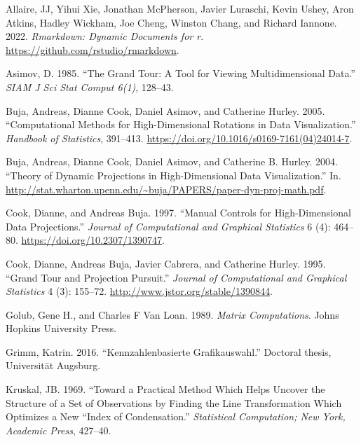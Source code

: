 \documentclass[
]{article}
\newlength{\cslhangindent}
\newlength{\cslentryspacingunit} %
\newenvironment{CSLReferences}[2] %
 {%
  \setlength{\parindent}{0pt}
  \ifodd #1
  \let\oldpar\par
  \def\par{\hangindent=\cslhangindent\oldpar}
  \fi
  \setlength{\parskip}{#2\cslentryspacingunit}
 }%
 {}
\begin{document}
\hypertarget{refs}{}
\begin{CSLReferences}{1}{0}
\leavevmode{}%
Allaire, JJ, Yihui Xie, Jonathan McPherson, Javier Luraschi, Kevin
Ushey, Aron Atkins, Hadley Wickham, Joe Cheng, Winston Chang, and
Richard Iannone. 2022. \emph{Rmarkdown: Dynamic Documents for r}.
\url{https://github.com/rstudio/rmarkdown}.

\leavevmode{}%
Asimov, D. 1985. {``The Grand Tour: A Tool for Viewing Multidimensional
Data.''} \emph{SIAM J Sci Stat Comput 6(1)}, 128--43.

\leavevmode{}%
Buja, Andreas, Dianne Cook, Daniel Asimov, and Catherine Hurley. 2005.
{``Computational Methods for High-Dimensional Rotations in Data
Visualization.''} \emph{Handbook of Statistics}, 391--413.
\url{https://doi.org/10.1016/s0169-7161(04)24014-7}.

\leavevmode{}%
Buja, Andreas, Dianne Cook, Daniel Asimov, and Catherine B. Hurley.
2004. {``Theory of Dynamic Projections in High-Dimensional Data
Visualization.''} In.
\url{http://stat.wharton.upenn.edu/~buja/PAPERS/paper-dyn-proj-math.pdf}.

\leavevmode{}%
Cook, Dianne, and Andreas Buja. 1997. {``Manual Controls for
High-Dimensional Data Projections.''} \emph{Journal of Computational and
Graphical Statistics} 6 (4): 464--80.
\url{https://doi.org/10.2307/1390747}.

\leavevmode{}%
Cook, Dianne, Andreas Buja, Javier Cabrera, and Catherine Hurley. 1995.
{``Grand Tour and Projection Pursuit.''} \emph{Journal of Computational
and Graphical Statistics} 4 (3): 155--72.
\url{http://www.jstor.org/stable/1390844}.

\leavevmode{}%
Golub, Gene H., and Charles F Van Loan. 1989. \emph{Matrix
Computations}. Johns Hopkins University Press.

\leavevmode{}%
Grimm, Katrin. 2016. {``Kennzahlenbasierte Grafikauswahl.''} Doctoral
thesis, Universit{ä}t Augsburg.

\leavevmode{}%
Kruskal, JB. 1969. {``Toward a Practical Method Which Helps Uncover the
Structure of a Set of Observations by Finding the Line Transformation
Which Optimizes a New ``Index of Condensation.''} \emph{Statistical
Computation; New York, Academic Press}, 427--40.


\end{CSLReferences}
\end{document}
